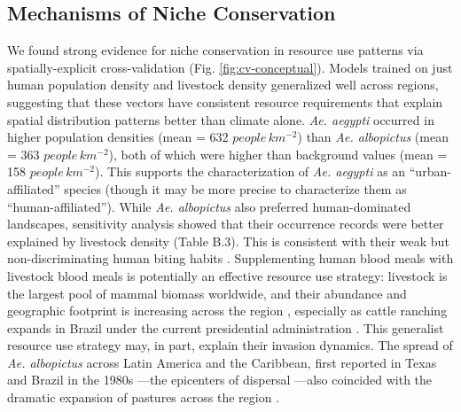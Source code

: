 \subsection{Mechanisms of Niche Conservation}

We found strong evidence for niche conservation in resource use patterns via spatially-explicit cross-validation (Fig. \ref{fig:cv-conceptual}). Models trained on just human population density and livestock density generalized well across regions, suggesting that these vectors have consistent resource requirements that explain spatial distribution patterns better than climate alone. \textit{Ae. aegypti} occurred in higher population densities (mean = 632 $people\, km^{-2}$) than \textit{Ae. albopictus} (mean = 363 $people\, km^{-2}$), both of which were higher than background values (mean = 158 $people\, km^{-2}$). This supports the characterization of \textit{Ae. aegypti} as an “urban-affiliated” species (though it may be more precise to characterize them as “human-affiliated”). While \textit{Ae. albopictus} also preferred human-dominated landscapes, sensitivity analysis showed that their occurrence records were better explained by livestock density (Table B.3). This is consistent with their weak but non-discriminating human biting habits \cite{Gratz2004-xn, Paupy2009-ft, Kamgang2012-sr}. Supplementing human blood meals with livestock blood meals is potentially an effective resource use strategy: livestock is the largest pool of mammal biomass worldwide, and their abundance and geographic footprint is increasing across the region \cite{Bar-On2018-vj, Nepstad_2017-ar, Gilbert2018-bm}, especially as cattle ranching expands in Brazil under the current presidential administration \cite{Rochedo2018-mf, Kroger2020-ys}. This generalist resource use strategy may, in part, explain their invasion dynamics. The spread of \textit{Ae. albopictus} across Latin America and the Caribbean, first reported in Texas and Brazil in the 1980s \cite{Moore1997-of, Santos2003-jy}
—the epicenters of dispersal \cite{Tatem2006-qu, Wagman2013-cx, Ortega-Morales2016-jd}—also coincided with the dramatic expansion of pastures across the region \cite{Geist2002-yo, Barbier2004-sv, Graesser2015-gq}.

